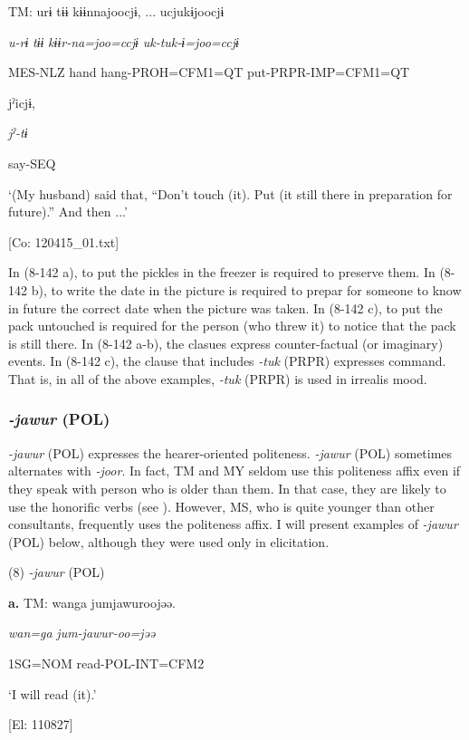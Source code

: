     TM:  urɨ  tɨɨ  kɨɨnnajoocjɨ, ...  ucjukɨjoocjɨ

      \textit{u-rɨ}  \textit{tɨɨ}  \textit{kɨɨr-na=joo=ccjɨ}  \textit{uk-tuk{}-ɨ=joo=ccjɨ}

      MES-NLZ  hand  hang-PROH=CFM1=QT  put-PRPR-IMP=CFM1=QT

      jˀicjɨ,      

      \textit{jˀ-tɨ}      

      say-SEQ      

      ‘(My husband) said that, “Don’t touch (it). Put (it still there in preparation for future).” And then ...’

      [Co: 120415\_01.txt]

In (8-142 a), to put the pickles in the freezer is required to preserve them. In (8-142 b), to write the date in the picture is required to prepar for someone to know in future the correct date when the picture was taken. In (8-142 c), to put the pack untouched is required for the person (who threw it) to notice that the pack is still there. In (8-142 a-b), the clasues express counter-factual (or imaginary) events. In (8-142 c), the clause that includes \textit{-tuk} (PRPR) expresses command. That is, in all of the above examples, \textit{{}-tuk} (PRPR) is used in irrealis mood.

\subsubsection{\textit{{}-jawur} (POL)}

\textit{{}-jawur} (POL) expresses the hearer-oriented politeness. \textit{{}-jawur} (POL) sometimes alternates with \textit{{}-joor}. In fact, TM and MY seldom use this politeness affix even if they speak with person who is older than them. In that case, they are likely to use the honorific verbs (see ). However, MS, who is quite younger than other consultants, frequently uses the politeness affix. I will present examples of \textit{{}-jawur} (POL) below, although they were used only in elicitation.

(8)  \textit{{}-jawur} (POL)

  \textbf{a.}  TM:  wanga  jumjawuroojəə.

      \textit{wan=ga}  \textit{jum-jawur{}-oo=jəə}

      1SG=NOM  read-POL-INT=CFM2

      ‘I will read (it).’

      [El: 110827]

